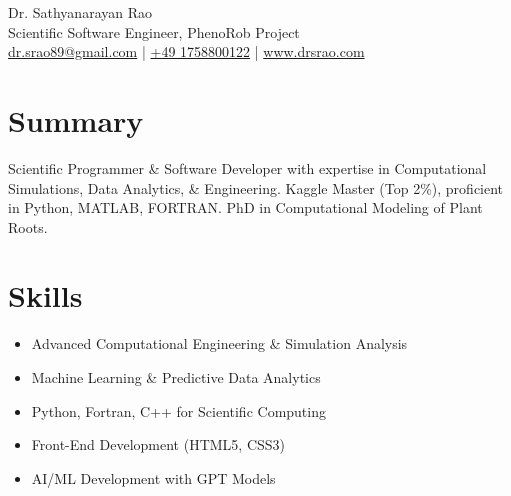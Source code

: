 \documentclass[11pt, a4paper]{article}
\begin{document}
\begin{center}
    {\LARGE Dr. Sathyanarayan Rao} \\
    \vspace{0.3cm}
    Scientific Software Engineer, PhenoRob Project \\
    \href{mailto:dr.srao89@gmail.com}{dr.srao89@gmail.com} | \href{tel:+491758800122}{+49 1758800122} | \href{https://www.drsrao.com}{www.drsrao.com}
\end{center}

\section*{Summary}
Scientific Programmer \& Software Developer with expertise in Computational Simulations, Data Analytics, \& Engineering. Kaggle Master (Top 2\%), proficient in Python, MATLAB, FORTRAN. PhD in Computational Modeling of Plant Roots.

\section*{Skills}
\begin{itemize}
    \item Advanced Computational Engineering \& Simulation Analysis
    \item Machine Learning \& Predictive Data Analytics
    \item Python, Fortran, C++ for Scientific Computing
    \item Front-End Development (HTML5, CSS3)
    \item AI/ML Development with GPT Models
\end{itemize}

\end{document}
